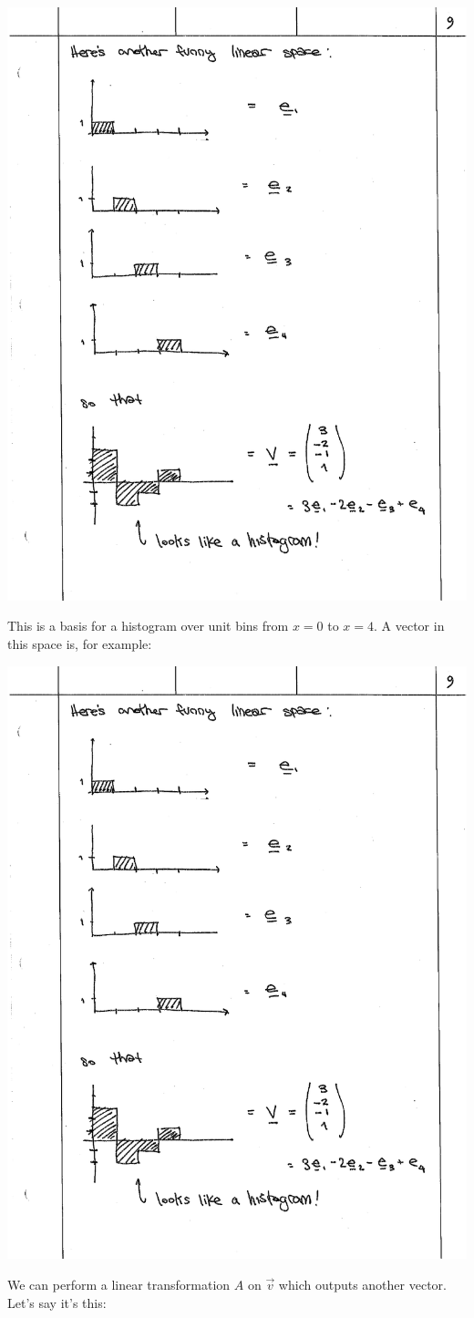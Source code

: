 \documentclass[
  11pt,
	colorful,
	raggedright,
]{tufte-style-thesis-flip}
\begin{document}
\begin{center}
\includegraphics[width=.45\textwidth]{figures/lec02_e4.pdf}
\end{center}

\noindent This is a basis for a histogram over unit bins from $x=0$ to $x=4$. A vector in this space is, for example:

\begin{center}
\includegraphics[width=.8\textwidth]{figures/lec02_hist.pdf}
\end{center}

\noindent We can perform a linear transformation $A$ on $\vec{v}$ which outputs another vector. Let’s say it’s this:
\end{document}
